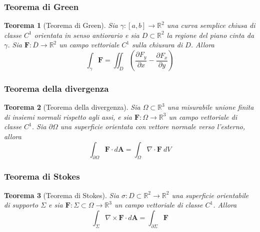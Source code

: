 \documentclass{article}
\newtheorem{theorem}{Teorema}
\begin{document}
            \subsubsection{Teorema di Green}
                \begin{theorem}[Teorema di Green]
                    Sia $\gamma: [a, b] \rightarrow \mathbb{R}^{2}$ una curva semplice chiusa di classe $C^{1}$ orientata in senso antiorario e sia $D \subset \mathbb{R}^{2}$ la regione del piano cinta da $\gamma$.
                    Sia $\mathbf{F}: \overline{D} \rightarrow \mathbb{R}^{2}$ un campo vettoriale $C^{1}$ sulla chiusura di $D$.
                    Allora
                    \[
                        \int_{\gamma} \mathbf{F} = \iint_{D} \left( \frac{\partial F_{y}}{\partial x} - \frac{\partial F_{x}}{\partial y} \right)
                    \]
                \end{theorem}

            \vspace{10pt}
            \subsubsection{Teorema della divergenza}
                \begin{theorem}[Teorema della divergenza]
                    Sia $\Omega \subset \mathbb{R}^{3}$ una misurabile unione finita di insiemi normali rispetto agli assi, e sia $\mathbf{F}: \Omega \rightarrow \mathbb{R}^{3}$ un campo vettoriale di classe $C^{1}$.
                    Sia $\partial \Omega$ una superficie orientata con vettore normale verso l'esterno, allora
                    \[
                        \int_{\partial \Omega} \mathbf{F} \cdot d \mathbf{A} = \int_{\Omega} \nabla \cdot \mathbf{F} \: dV 
                    \]
                \end{theorem}

            \vspace{10pt}
            \subsubsection{Teorema di Stokes}
                \begin{theorem}[Teorema di Stokes]
                    Sia $\sigma: D \subset \mathbb{R}^2 \rightarrow \mathbb{R}^{2}$ una superficie orientabile di supporto $\Sigma$ e sia $\mathbf{F}: \Sigma \subset \Omega \rightarrow \mathbb{R}^{3}$ un campo vettoriale di classe $C^{1}$.
                    Allora 
                    \[
                        \int_{\Sigma} \nabla \times \mathbf{F} \cdot d \mathbf{A} = \int_{\partial \Sigma} \mathbf{F} 
                    \]
                \end{theorem}
            
\end{document}
